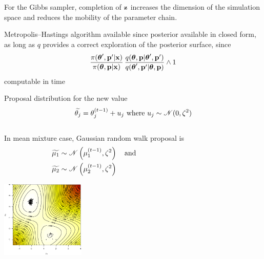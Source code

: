 \begin{slide}
For the Gibbs sampler, completion of ${\bf z}$ increases the dimension of the simulation space 
and reduces the mobility of the parameter chain.

\vs\pause
Metropolis--Hastings algorithm available since posterior 
available in closed form, as long as $q$ provides a correct
exploration of the posterior surface, since 
$$
\frac{\pi(\mbox{\boldmath{$\theta$}}^\prime,\mathbf{p}^\prime|\mathbf{x})}{\pi(\mbox{\boldmath{$\theta$}},\mathbf{p}|\mathbf{x})}\,
\frac{q(\mbox{\boldmath{$\theta$}},\mathbf{p}|\mbox{\boldmath{$\theta$}}^\prime,\mathbf{p}^\prime)}{q(\mbox{\boldmath{$\theta$}}^\prime,\mathbf{p}^\prime|\mbox{\boldmath{$\theta$}},\mathbf{p})}\wedge 1
$$
computable in  time

\end{slide}\begin{slide}

Proposal distribution for the new value
$$
\widetilde{\theta_j}=\theta_j^{(t-1)}+u_j\hbox{ where }u_j\sim\mathscr{N}(0,\zeta^2)
$$

\vs\pause
\begin{columns}
In mean mixture case, Gaussian random walk proposal is
\begin{align*}
\widetilde{\mu_1}&\sim\mathscr{N}\left(\mu_1^{(t-1)},\zeta^2\right)\quad\hbox{and}\\
\widetilde{\mu_2}&\sim\mathscr{N}\left(\mu_2^{(t-1)},\zeta^2\right)\,
\end{align*}
\includegraphics[height=4cm,width=4cm]{figures/hmn2d1.eps}
\end{columns}

\end{slide}\begin{slide}


\end{slide}
